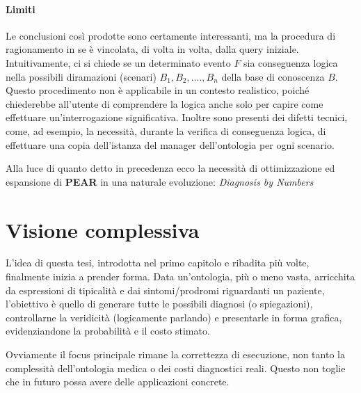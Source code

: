 \paragraph{Limiti}
Le conclusioni così prodotte sono certamente interessanti, ma la procedura di ragionamento in se è vincolata, di volta
in volta, dalla query iniziale. \\Intuitivamente, ci si chiede se un determinato evento $ F $ sia 
conseguenza logica nella possibili diramazioni (scenari) $ B_1,B_2,....,B_n $ della base di conoscenza $ B $.
Questo procedimento non è applicabile in un contesto realistico, poiché chiederebbe all'utente di comprendere
la logica anche solo per capire come effettuare un'interrogazione significativa.
Inoltre sono presenti dei difetti tecnici, come, ad esempio, la necessità, durante la verifica di
conseguenza logica, di effettuare una copia dell'istanza del manager dell'ontologia per ogni scenario.

Alla luce di quanto detto in precedenza ecco la necessità di ottimizzazione ed espansione di \textbf{PEAR} in 
una naturale evoluzione: \textsl{Diagnosis by Numbers}

\section{Visione complessiva}
L'idea di questa tesi, introdotta nel primo capitolo e ribadita più volte, finalmente inizia a prender forma.
Data un'ontologia, più o meno vasta, arricchita da espressioni di tipicalità e dai sintomi/prodromi
riguardanti un paziente, l'obiettivo è quello di generare tutte le possibili diagnosi (o spiegazioni),
controllarne la veridicità (logicamente parlando) e presentarle in forma grafica, evidenziandone la 
probabilità e il costo stimato.

Ovviamente il focus principale rimane la correttezza di esecuzione, non tanto la complessità dell'ontologia
medica o dei costi diagnostici reali. Questo non toglie che in futuro possa avere delle applicazioni concrete.

